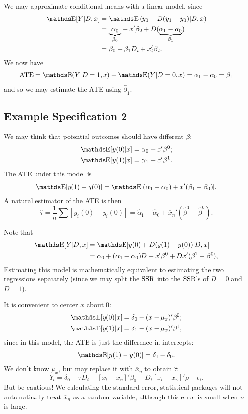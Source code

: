 \documentclass[letterpaper, 10pt]{article}
\DeclareMathOperator{\ATE}{ATE}
\begin{document}
We may approximate conditional means with a linear model, since
\begin{align*}
  \E[Y|D, x]
  &= \E\left( y_0 + D(y_1 - y_0) | D, x\right) \\
  &= {\underbrace{\alpha_0}_{\beta_0}} + x' \beta_2 + D(\underbrace{\alpha_1 - \alpha_0}_{\beta_1}) \\
  &= \beta_0 + \beta_1 D_i + x_i' \beta_2.
\end{align*}
We now have
\[
  \ATE
  = \E(Y|D = 1, x) - \E(Y|D = 0, x)
  = \alpha_1 - \alpha_0
  = \beta_1
\]
and so we may estimate the ATE using \(\hat{\beta}_1\).


\subsection{Example Specification 2}
We may think that potential outcomes should have different \(\beta\):
\begin{align*}
  \E[y(0)|x]
  &= \alpha_0 + x' \beta^0; \\
  \E[y(1)|x]
  &= \alpha_1 + x' \beta^1.
\end{align*}
The ATE under this model is
\[
  \E[y(1) - y(0)]
  = \E[(\alpha_1 - \alpha_0) + x'(\beta_1 - \beta_0)].
\]
A natural estimator of the ATE is then
\[
  \hat{\tau}
  = \frac{1}{n} \sum [y_i(0) - y_i(0)]
  = \hat{\alpha}_1 - \hat{\alpha}_0 + \overline{x}_n' (\hat{\beta}^1 - \hat{\beta}^0).
\]

Note that
\begin{align*}
  \E[Y|D, x]
  &= \E[y(0) + D(y(1) - y(0)) | D, x] \\
  &= \alpha_0 + (\alpha_1 - \alpha_0) D + x' \beta^0 + D x' (\beta^1 - \beta^0),
\end{align*}
Estimating this model is mathematically equivalent to estimating the two regressions separately (since we may split the \(\operatorname{SSR}\) into the \(\operatorname{SSR}\)'s of \(D = 0\) and \(D = 1\)).

It is convenient to center \(x\) about \(0\):
\begin{align*}
  \E[y(0)|x]
  &= \delta_0 + (x - \mu_x)' \beta^0; \\
  \E[y(1)|x]
  &= \delta_1 + (x - \mu_x)' \beta^1,
\end{align*}
since in this model, the ATE is just the difference in intercepts:
\[
  \E[y(1) - y(0)]
  = \delta_1 - \delta_0.
\]
We don't know \(\mu_x\), but may replace it with \(\overline{x}_n\) to obtain \(\hat{\tau}\):
\[
  Y_i
  = \delta_0 + \tau D_i + [x_i - \overline{x}_n]' \beta_0 + D_i [x_i - \overline{x}_n]' \rho + \epsilon_i.
\]
But be cautious!
We calculating the standard error, statistical packages will not automatically treat \(\overline{x}_n\) as a random variable, although this error is small when \(n\) is large.
\end{document}
